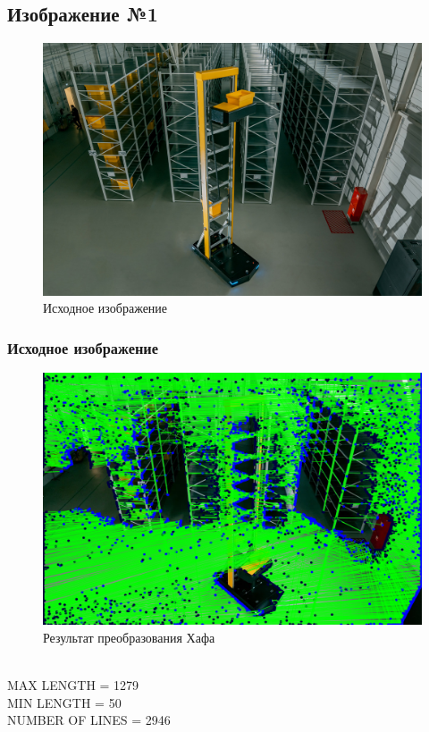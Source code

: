 \subsection{Изображение №1}

\begin{figure}[H]
    \includegraphics[width=\textwidth]{../source/test.png}
    \caption{Исходное изображение}
    \label{fig:source_image}
\end{figure}

\subsubsection{Исходное изображение}

\begin{figure}[H]
    \includegraphics[width=\textwidth]{../outputs/image1_ordinary.png}
    \caption{Результат преобразования Хафа}
    \label{fig:image1_ordinary}
\end{figure}
\ \\
MAX LENGTH = 1279 \\
MIN LENGTH = 50 \ \\
NUMBER OF LINES = 2946

